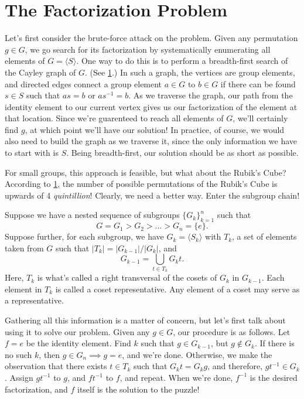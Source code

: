 \documentclass[12pt]{article}
\begin{document}
\section{The Factorization Problem}

Let's first consider the brute-force attack on the problem.  Given any permutation
$g\in G$, we go search for its factorization by systematically enumerating all
elements of $G=\langle S\rangle$.  One way to do this is to
perform a breadth-first search of the Cayley graph of $G$.  (See \ref{}.)  In such a graph,
the vertices are group elements, and directed edges connect a group
element $a\in G$ to $b\in G$ if there can be found $s\in S$ such
that $as=b$ or $as^{-1}=b$.  As we traverse the graph, our path
from the identity element to our current vertex gives us our
factorization of the element at that location.  Since we're guarenteed
to reach all elements of $G$, we'll certainly find $g$, at which
point we'll have our solution!  In practice, of course, we would also
need to build the graph as we traverse it, since the only information
we have to start with is $S$.  Being breadth-first, our solution should
be as short as possible.

For small groups, this approach is feasible, but what about the
Rubik's Cube?  According to \ref{}, the number of possible permutations
of the Rubik's Cube is upwards of 4 \textit{quintillion}!  Clearly, we need
a better way.  Enter the subgroup chain!

Suppose we have a nested sequence of subgroups $\{G_k\}_{k=1}^n$
such that
\begin{equation*}
G = G_1> G_2>\dots> G_n = \{e\}.
\end{equation*}
Suppose further, for each subgroup, we have $G_k=\langle S_k\rangle$
with $T_k$, a set of elements taken from $G$ such that
$|T_k|=|G_{k-1}|/|G_k|$, and
\begin{equation*}
G_{k-1} = \bigcup_{t\in T_k} G_kt.
\end{equation*}
Here, $T_k$ is what's called a right transversal of the cosets of $G_k$
in $G_{k-1}$.  Each element in $T_k$ is called a coset representative.
Any element of a coset may serve as a representative.

Gathering all this information is a matter of concern, but let's first talk about using it
to solve our problem.  Given any $g\in G$, our procedure is as follows.  Let $f=e$ be the identity element.
Find $k$ such that $g\in G_{k-1}$, but $g\not\in G_k$.  If there is no such $k$,
then $g\in G_n\implies g=e$, and we're done.  Otherwise, we make the observation
that there exists $t\in T_k$ such that $G_kt=G_kg$, and therefore, $gt^{-1}\in G_k$.
Assign $gt^{-1}$ to $g$, and $ft^{-1}$ to $f$, and repeat.  When we're done,
$f^{-1}$ is the desired factorization, and $f$ itself is the solution to the puzzle!
\end{document}
